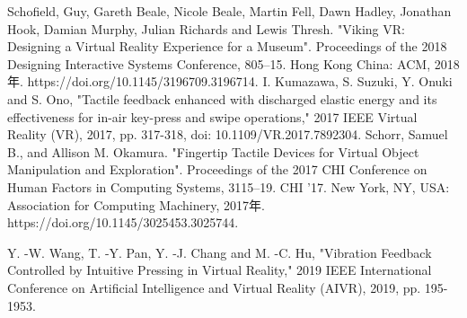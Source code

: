 \begin{thebibliography}{99}
	Schofield, Guy, Gareth Beale, Nicole Beale, Martin Fell, Dawn Hadley, Jonathan Hook, Damian Murphy, Julian Richards and Lewis Thresh.
	"Viking VR: Designing a Virtual Reality Experience for a Museum".
	Proceedings of the 2018 Designing Interactive Systems Conference, 805–15. Hong Kong China: ACM, 2018年.
	https://doi.org/10.1145/3196709.3196714.
	I. Kumazawa, S. Suzuki, Y. Onuki and S. Ono,
	"Tactile feedback enhanced with discharged elastic energy and its effectiveness for in-air key-press and swipe operations,"
	2017 IEEE Virtual Reality (VR), 2017, pp. 317-318, doi: 10.1109/VR.2017.7892304.
	Schorr, Samuel B., and Allison M. Okamura.
	"Fingertip Tactile Devices for Virtual Object Manipulation and Exploration".
	Proceedings of the 2017 CHI Conference on Human Factors in Computing Systems, 3115–19. CHI ’17. New York, NY, USA: Association for Computing Machinery, 2017年.
	https://doi.org/10.1145/3025453.3025744.

	Y. -W. Wang, T. -Y. Pan, Y. -J. Chang and M. -C. Hu,
	"Vibration Feedback Controlled by Intuitive Pressing in Virtual Reality," 2019 IEEE International Conference on Artificial Intelligence and Virtual Reality (AIVR), 2019, pp. 195-1953.
\end{thebibliography}
